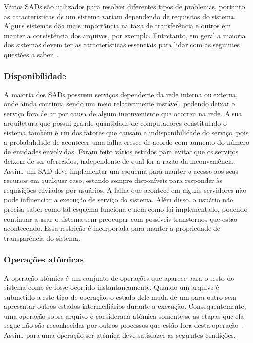 	Vários SADs são utilizados para resolver diferentes tipos de problemas, portanto as características de um sistema variam dependendo de requisitos do sistema. Alguns sistemas dão mais importância na taxa de transferência e outros em manter a consistência dos arquivos, por exemplo. Entretanto, em geral a maioria dos sistemas devem ter as características essenciais para lidar com as seguintes questões a saber~\cite{tanenbaum07,coulouris06, galli00, kon94}.
	
	\subsubsection{Disponibilidade}
	A maioria dos SADs possuem serviços dependente da rede interna ou externa, onde ainda continua sendo um meio relativamente instável, podendo deixar o serviço fora de ar por causa de algum inconveniente que ocorreu na rede. A sua arquitetura que possui grande quantidade de computadores constituindo o sistema também é um dos fatores que causam a indisponibilidade do serviço, pois a probabilidade de acontecer uma falha cresce de acordo com aumento do número de entidades envolvidas. Foram feito vários estudos para evitar que os serviços deixem de ser oferecidos, independente de qual for a razão da inconveniência. Assim, um SAD deve implementar um esquema para manter o acesso aos seus recursos em qualquer caso, estando sempre disponíveis para responder às requisições enviados por usuários. A falha que acontece em alguns servidores não pode influenciar a execução de serviço do sistema. Além disso, o usuário não precisa saber como tal esquema funciona e nem como foi implementado, podendo continuar a usar o sistema sem preocupar com possíveis transtornos que estão acontecendo. Essa restrição é incorporada para manter a propriedade de transparência do sistema.
	
	\subsubsection{Operações atômicas}
	A operação atômica é um conjunto de operações que aparece para o resto do sistema como se fosse ocorrido instantaneamente.
	Quando um arquivo é submetido a este tipo de operação, o estado dele muda de um para outro sem apresentar outros estados intermediários durante a execução.
	Consequentemente, uma operação sobre arquivo é considerada atômica somente se as etapas que ela segue não são reconhecidas por outros processos que estão fora desta operação~\cite{tanenbaum07_2}. 
	Assim, para uma operação ser atômica deve satisfazer as seguintes condições.
	
